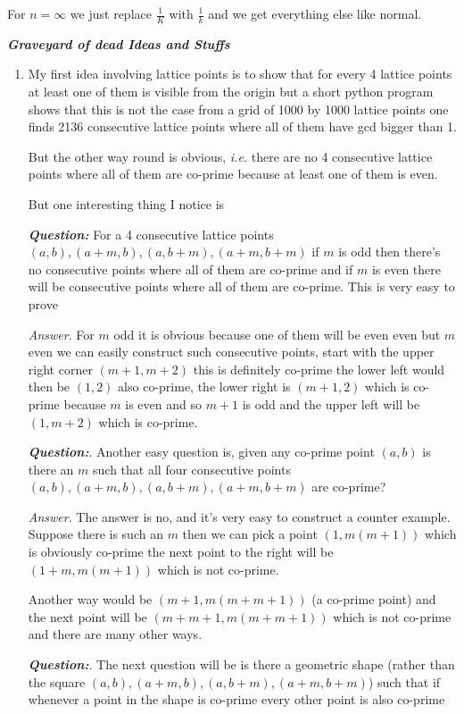 \documentclass[aps,preprint,preprintnumbers,nofootinbib,showpacs,prd]{revtex4-1}
\newcommand{\ie}{{\it i.e.} }
\begin{document}
For $n = \infty$ we just replace $\frac{1}{K}$ with $\frac{1}{k}$ and we get everything else like normal.


\bigskip
\textbf{\textit{Graveyard of dead Ideas and Stuffs}}
\bigskip

%
\begin{enumerate}
\item My first idea involving lattice points is to show that for every 4 lattice points at least one of them is visible from the origin but a short python program shows that this is not the case from a grid of 1000 by 1000 lattice points one finds 2136 consecutive lattice points where all of them have gcd bigger than 1.

But the other way round is obvious, \ie there are no 4 consecutive lattice points where all of them are co-prime because at least one of them is even.

But one interesting thing I notice is

\textit{\textbf{Question:}} For a 4 consecutive lattice points $(a,b), (a+m,b), (a,b+m), (a+m,b+m)$ if $m$ is odd then there's no consecutive points where all of them are co-prime and if $m$ is even there will be consecutive points where all of them are co-prime. This is very easy to prove 

{\it Answer}. For $m$ odd it is obvious because one of them will be even even but $m$ even we can easily construct such consecutive points, start with the upper right corner $(m+1, m+2)$ this is definitely co-prime the lower left would then be $(1,2)$ also co-prime, the lower right is $(m+1,2)$ which is co-prime because $m$ is even and so $m+1$ is odd and the upper left will be $(1,m+2)$ which is co-prime.

\textbf{\textit{Question:}}. Another easy question is, given any co-prime point $(a,b)$ is there an $m$ such that all four consecutive points $(a,b), (a+m,b),(a,b+m),(a+m,b+m)$ are co-prime?

{\it Answer}. The answer is no, and it's very easy to construct a counter example. Suppose there is such an $m$ then we can pick a point $(1,m(m+1))$ which is obviously co-prime the next point to the right will be $(1+m, m(m + 1))$ which is not co-prime.

Another way would be $(m+1, m(m +  m + 1))$ (a co-prime point) and the next point will be $(m + m + 1, m(m + m + 1))$ which is not co-prime and there are many other ways.

\textbf{\textit{Question:}}. The next question will be is there a geometric shape (rather than the square $(a,b),(a+m,b),(a,b+m),(a+m,b+m)$) such that if whenever a point in the shape is co-prime every other point is also co-prime


\end{enumerate}
\end{document}
